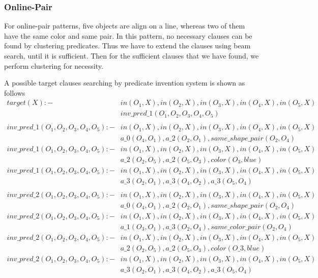 \documentclass[
]{ceurart}
\begin{document}
\subsubsection{Online-Pair}
For online-pair patterns, five objects are align on a line, whereas two of them have the same color and same pair. 
In this pattern, no necessary clauses can be found  by clustering predicates. Thus we have to extend the clauses using beam search, until it is sufficient. Then for the sufficient clauses that we have found, we perform clustering for necessity.

A possible target clauses searching by predicate invention system is shown as follows
\begin{align*}
	target(X) :- & in(O_1,X),in(O_2,X),in(O_3,X),in(O_4,X),in(O_5,X) \\
						& inv\_pred\_1(O_1,O_2,O_3,O_4,O_5)\\
			 			\\
		inv\_pred\_1(O_1,O_2,O_3,O_4,O_5) :- 	& in(O_1,X),in(O_2,X),in(O_3,X),in(O_4,X),in(O_5,X) \\
																				& a\_0(O_4,O_1),a\_2(O_2,O_1), same\_shape\_pair(O_2,O_4)\\
	inv\_pred\_1(O_1,O_2,O_3,O_4,O_5) :- 	& in(O_1,X),in(O_2,X),in(O_3,X),in(O_4,X),in(O_5,X) \\
																			& a\_2(O_2,O_5),a\_2(O_5,O_3),color(O_3, blue)\\
	inv\_pred\_1(O_1,O_2,O_3,O_4,O_5) :- 	& in(O_1,X),in(O_2,X),in(O_3,X),in(O_4,X),in(O_5,X) \\
																			& a\_3(O_2,O_1),a\_3(O_4,O_2),a\_3(O_5,O_4)\\
																			\\
	inv\_pred\_2(O_1,O_2,O_3,O_4,O_5) :- 	& in(O_1,X),in(O_2,X),in(O_3,X),in(O_4,X),in(O_5,X) \\
																			& a\_0(O_4,O_1),a\_2(O_2,O_1),same\_shape\_pair(O_2,O_4)\\
	inv\_pred\_2(O_1,O_2,O_3,O_4,O_5) :- 	& in(O_1,X),in(O_2,X),in(O_3,X),in(O_4,X),in(O_5,X) \\
																			& a\_1(O_3,O_1),a\_3(O_2,O_4),same\_color\_pair(O_2,O_4)\\																			
	inv\_pred\_2(O_1,O_2,O_3,O_4,O_5) :- 	& in(O_1,X),in(O_2,X),in(O_3,X),in(O_4,X),in(O_5,X) \\
																			& a\_2(O_2,O_5),a\_2(O_5,O_3),color(O\_3, blue)\\
	inv\_pred\_2(O_1,O_2,O_3,O_4,O_5) :- 	& in(O_1,X),in(O_2,X),in(O_3,X),in(O_4,X),in(O_5,X) \\
																			& a\_3(O_2,O_1),a\_3(O_4,O_2),a\_3(O_5,O_4)\\																			
\end{align*}
\end{document}
